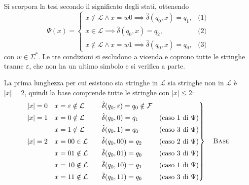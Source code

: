 \documentclass[a4paper, 11pt, oneside]{book}
\theoremstyle{formale}
\begin{document}
    Si scorpora la tesi secondo il significato degli stati, ottenendo
    \begin{equation*}
        \Psi(x) =
        \begin{cases}
            x \notin \mathcal{L} \land x = w0 \implies \hat{\delta}(q_0, x) = q_1,
                & \text{(1)} \\
            x \in \mathcal{L} \implies \hat{\delta}(q_0, x) = q_2,
                & \text{(2)} \\
            x \notin \mathcal{L} \land x = w1 \implies \hat{\delta}(q_0, x) = q_0,
                & \text{(3)}
        \end{cases}
    \end{equation*}
    con $w \in \Sigma^*$. Le tre condizioni si escludono a vicenda e coprono tutte le
    stringhe tranne $\varepsilon$, che non ha un ultimo simbolo e si verifica a parte.

    La prima lunghezza per cui esistono sia stringhe in $\mathcal{L}$ sia stringhe non in
    $\mathcal{L}$ \`e $|x| = 2$, quindi la base comprende tutte le stringhe con
    $|x| \leq 2$:
    \begin{equation*}
        \left.
        \begin{alignedat}{3}
            |x| = 0 \quad & x = \varepsilon \notin \mathcal{L} & \qquad
                & \hat{\delta}(q_0, \varepsilon) = q_0 \notin \mathcal{F} & & \\
            |x| = 1 \quad & x = 0 \notin \mathcal{L} &
                & \hat{\delta}(q_0, 0) = q_1
                &\quad & \text{(caso 1 di $\Psi$)} \\
            & x = 1 \notin \mathcal{L} &
                & \hat{\delta}(q_0, 1) = q_0
                && \text{(caso 3 di $\Psi$)} \\
            |x| = 2 \quad & x = 00 \in \mathcal{L} &
                & \hat{\delta}(q_0, 00) = q_2
                && \text{(caso 2 di $\Psi$)} \\
            & x = 01 \notin \mathcal{L} &
                & \hat{\delta}(q_0, 01) = q_0
                && \text{(caso 3 di $\Psi$)} \\
            & x = 10 \notin \mathcal{L} &
                & \hat{\delta}(q_0, 10) = q_1
                && \text{(caso 1 di $\Psi$)} \\
            & x = 11 \notin \mathcal{L} &
                & \hat{\delta}(q_0, 11) = q_0
                && \text{(caso 3 di $\Psi$)}
        \end{alignedat}
        \right\}
        \quad \text{\textsc{Base}}
    \end{equation*}
\end{document}
